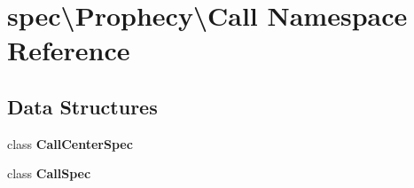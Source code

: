 \section{spec\textbackslash{}Prophecy\textbackslash{}Call Namespace Reference}
\label{namespacespec_1_1_prophecy_1_1_call}
\subsection*{Data Structures}
\begin{DoxyCompactItemize}
\item 
class {\bf Call\+Center\+Spec}
\item 
class {\bf Call\+Spec}
\end{DoxyCompactItemize}

